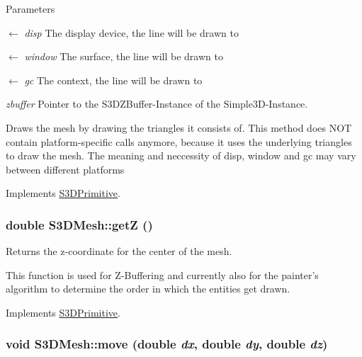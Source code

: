 \begin{DoxyParams}{Parameters}
\item[\mbox{$\leftarrow$} {\em disp}]The display device, the line will be drawn to \item[\mbox{$\leftarrow$} {\em window}]The surface, the line will be drawn to \item[\mbox{$\leftarrow$} {\em gc}]The context, the line will be drawn to \item[{\em zbuffer}]Pointer to the S3DZBuffer-\/Instance of the Simple3D-\/Instance.\end{DoxyParams}
Draws the mesh by drawing the triangles it consists of. This method does NOT contain platform-\/specific calls anymore, because it uses the underlying triangles to draw the mesh. The meaning and neccessity of disp, window and gc may vary between different platforms 

Implements \hyperlink{class_s3_d_primitive_a857f042bc63ae6233b63b60089e92b81}{S3DPrimitive}.

\hypertarget{class_s3_d_mesh_aa11c4dd0ce01443c07afaabc0e206881}{
\subsubsection[{getZ}]{\setlength{\rightskip}{0pt plus 5cm}double S3DMesh::getZ ()}}
\label{class_s3_d_mesh_aa11c4dd0ce01443c07afaabc0e206881}


Returns the z-\/coordinate for the center of the mesh. 

This function is used for Z-\/Buffering and currently also for the painter's algorithm to determine the order in which the entities get drawn. 

Implements \hyperlink{class_s3_d_primitive_ab5b06d3a8e83216cc42554bb78afd2d9}{S3DPrimitive}.

\hypertarget{class_s3_d_mesh_a15edf10bf8a749627f11235c618734f7}{
\subsubsection[{move}]{\setlength{\rightskip}{0pt plus 5cm}void S3DMesh::move (double {\em dx}, \/  double {\em dy}, \/  double {\em dz})}}
\label{class_s3_d_mesh_a15edf10bf8a749627f11235c618734f7}


